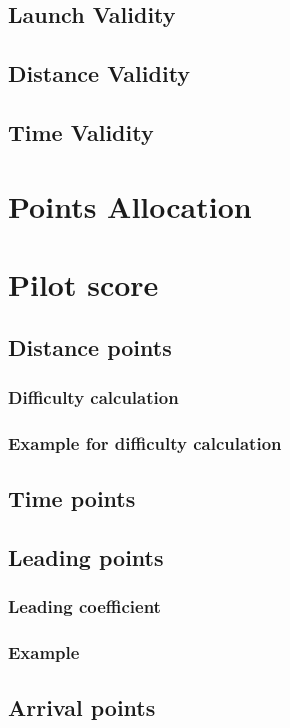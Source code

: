 \documentclass{article}
\begin{document}
\subsection{Launch Validity}
\subsection{Distance Validity}
\subsection{Time Validity}

\newpage
\section{Points Allocation}

\newpage
\section{Pilot score}
\subsection{Distance points}
\subsubsection{Difficulty calculation}
\subsubsection{Example for difficulty calculation}
\subsection{Time points}
\subsection{Leading points}
\subsubsection{Leading coefficient}
\subsubsection{Example}
\subsection{Arrival points}
\end{document}
